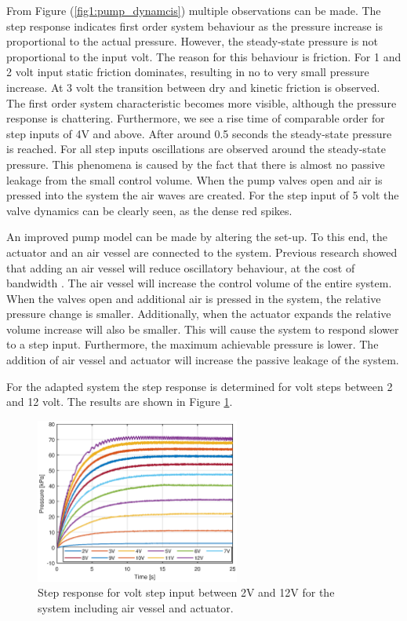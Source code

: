 From Figure (\ref{fig1:pump_dynamcis}) multiple observations can be made. The step response indicates first order system behaviour as the pressure increase is proportional to the actual pressure. However, the steady-state pressure is not proportional to the input volt. The reason for this behaviour is friction. For 1 and 2 volt input static friction dominates, resulting in no to very small pressure increase.
At 3 volt the transition between dry and kinetic friction is observed. The first order system characteristic becomes more visible, although the pressure response is chattering. Furthermore, we see a rise time of comparable order for step inputs of 4V and above. After around 0.5 seconds the steady-state pressure is reached. For all step inputs oscillations are observed around the steady-state pressure. This phenomena is caused by the fact that there is almost no passive leakage from the small control volume. When the pump valves open and air is pressed into the system the air waves are created. For the step input of 5 volt the valve dynamics can be clearly seen, as the dense red spikes.

An improved pump model can be made by altering the set-up. To this end, the actuator and an air vessel are connected to the system. Previous research showed that adding an air vessel will reduce oscillatory behaviour, at the cost of bandwidth \cite{proper}. The air vessel will increase the control volume of the entire system. When the valves open and additional air is pressed in the system, the relative pressure change is smaller. Additionally, when the actuator expands the relative volume increase will also be smaller. This will cause the system to respond slower to a step input. Furthermore, the maximum achievable pressure is lower. The addition of air vessel and actuator will increase the passive leakage of the system.

For the adapted system the step response is determined for volt steps between 2 and 12 volt. The results are shown in Figure \ref{fig3:pump_dynamics_adapted}.

\begin{figure}[H]
    \centering
    \includegraphics[width = 0.6\textwidth]{Figures/Chapter3/step212V.eps}
    \caption{Step response for volt step input between 2V and 12V for the system including air vessel and actuator.}
    \label{fig3:pump_dynamics_adapted}
\end{figure}


